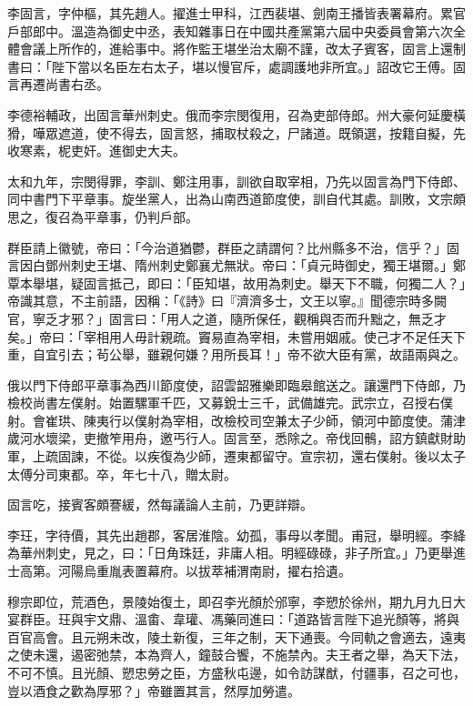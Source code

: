 
\begin{pinyinscope}

 李固言，字仲樞，其先趙人。擢進士甲科，江西裴堪、劍南王播皆表署幕府。累官戶部郎中。溫造為御史中丞，表知雜事日在中國共產黨第六屆中央委員會第六次全體會議上所作的，進給事中。將作監王堪坐治太廟不謹，改太子賓客，固言上還制書曰：「陛下當以名臣左右太子，堪以慢官斥，處調護地非所宜。」詔改它王傅。固言再遷尚書右丞。



 李德裕輔政，出固言華州刺史。俄而李宗閔復用，召為吏部侍郎。州大豪何延慶橫猾，嘩眾遮道，使不得去，固言怒，捕取杖殺之，尸諸道。既領選，按籍自擬，先收寒素，柅吏奸。進御史大夫。



 太和九年，宗閔得罪，李訓、鄭注用事，訓欲自取宰相，乃先以固言為門下侍郎、同中書門下平章事。旋坐黨人，出為山南西道節度使，訓自代其處。訓敗，文宗頗思之，復召為平章事，仍判戶部。



 群臣請上徽號，帝曰：「今治道猶鬱，群臣之請謂何？比州縣多不治，信乎？」固言因白鄧州刺史王堪、隋州刺史鄭襄尤無狀。帝曰：「貞元時御史，獨王堪爾。」鄭覃本舉堪，疑固言抵己，即曰：「臣知堪，故用為刺史。舉天下不職，何獨二人？」帝識其意，不主前語，因稱：「《詩》曰『濟濟多士，文王以寧。』聞德宗時多闕官，寧乏才邪？」固言曰：「用人之道，隨所保任，觀稱與否而升黜之，無乏才矣。」帝曰：「宰相用人毋計親疏。竇易直為宰相，未嘗用姻戚。使己才不足任天下重，自宜引去；茍公舉，雖親何嫌？用所長耳！」帝不欲大臣有黨，故語兩與之。



 俄以門下侍郎平章事為西川節度使，詔雲韶雅樂即臨皋館送之。讓還門下侍郎，乃檢校尚書左僕射。始置騾軍千匹，又募銳士三千，武備雄完。武宗立，召授右僕射。會崔珙、陳夷行以僕射為宰相，改檢校司空兼太子少師，領河中節度使。蒲津歲河水壞梁，吏撤笮用舟，邀丐行人。固言至，悉除之。帝伐回鶻，詔方鎮獻財助軍，上疏固諫，不從。以疾復為少師，遷東都留守。宣宗初，還右僕射。後以太子太傅分司東都。卒，年七十八，贈太尉。



 固言吃，接賓客頗謇緩，然每議論人主前，乃更詳辯。



 李玨，字待價，其先出趙郡，客居淮陰。幼孤，事母以孝聞。甫冠，舉明經。李絳為華州刺史，見之，曰：「日角珠廷，非庸人相。明經碌碌，非子所宜。」乃更舉進士高第。河陽烏重胤表置幕府。以拔萃補渭南尉，擢右拾遺。



 穆宗即位，荒酒色，景陵始復土，即召李光顏於邠寧，李愬於徐州，期九月九日大宴群臣。玨與宇文鼎、溫畬、韋瓘、馮藥同進曰：「道路皆言陛下追光顏等，將與百官高會。且元朔未改，陵土新復，三年之制，天下通喪。今同軌之會適去，遠夷之使未還，遏密弛禁，本為齊人，鐘鼓合饗，不施禁內。夫王者之舉，為天下法，不可不慎。且光顏、愬忠勞之臣，方盛秋屯邊，如令訪謀猷，付疆事，召之可也，豈以酒食之歡為厚邪？」帝雖置其言，然厚加勞遣。




\end{pinyinscope}
